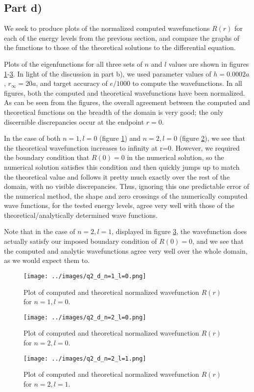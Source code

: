 \documentclass{article}
\begin{document}
\subsection{Part d)}

We seek to produce plots of the normalized computed wavefunctions $R(r)$ for each of the energy levels from the previous section, and compare the graphs of the functions to those of the theoretical solutions to the differential equation.

Plots of the eigenfunctions for all three sets of $n$ and $l$ values are shown in figures \ref{fig:q2_d_n=1_l=0}-\ref{fig:q2_d_n=2_l=1}. In light of the discussion in part b), we used parameter values of $h=0.0002a$, $r_\infty=20a$, and target accuracy of  $e/1000$ to compute the wavefunctions. In all figures, both the computed and theoretical wavefunctions have been normalized. As can be seen from the figures, the overall agreement between the computed and theoretical functions on the breadth of the domain is very good; the only discernible discrepancies occur at the endpoint $r=0$.

In the case of both $n=1, l=0$ (figure \ref{fig:q2_d_n=1_l=0}) and $n=2, l=0$ (figure \ref{fig:q2_d_n=2_l=0}), we see that the theoretical wavefunction increases to infinity at r=0. However, we required the boundary condition that $R(0) = 0$ in the numerical solution, so the numerical solution satisfies this condition and then quickly jumps up to match the theoretical value and follows it pretty much exactly over the rest of the domain, with no visible discrepancies. Thus, ignoring this one predictable error of the numerical method, the shape and zero crossings of the numerically computed wave functions, for the tested energy levels, agree very well with those of the theoretical/analytically determined wave functions.

Note that in the case of $n=2, l=1$, displayed in figure \ref{fig:q2_d_n=2_l=1}, the wavefunction does actually satisfy our imposed boundary condition of $R(0) = 0$, and we see that the computed and analytic wavefunctions agree very well over the whole domain, as we would expect them to.

\begin{figure}[H]
	\centering
	\texttt{[image: ../images/q2\_d\_n=1\_l=0.png]}
	\caption{Plot of computed and theoretical normalized wavefunction $R(r)$ for $n=1, l=0$.}
	\label{fig:q2_d_n=1_l=0}
\end{figure}

\begin{figure}[H]
	\centering
	\texttt{[image: ../images/q2\_d\_n=2\_l=0.png]}
	\caption{Plot of computed and theoretical normalized wavefunction $R(r)$ for $n=2, l=0$.}
	\label{fig:q2_d_n=2_l=0}
\end{figure}

\begin{figure}[H]
	\centering
	\texttt{[image: ../images/q2\_d\_n=2\_l=1.png]}
	\caption{Plot of computed and theoretical normalized wavefunction $R(r)$ for $n=2, l=1$.}
	\label{fig:q2_d_n=2_l=1}
\end{figure}
\end{document}
